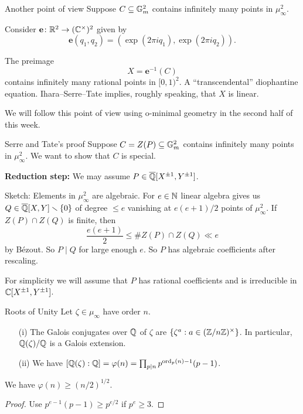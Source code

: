 \documentclass{beamer}
\begin{document}
\begin{frame}{Another point of view}
  Suppose $C\subseteq {\mathbb{G}}_m^2$ contains infinitely many points in
  $\mu_\infty^2$. 
  
  Consider $\mathbf{e}\colon {\mathbb{R}}^2\rightarrow({\mathbb{C}}^\times)^2$ given by
  $$\mathbf{e}(q_1,q_2) = (\exp(2\pi i q_1),\exp(2\pi i q_2)).$$

  The preimage
  \begin{equation*}
    X=\mathbf{e}^{-1}(C)
  \end{equation*}
  contains infinitely many rational points in $[0,1)^2$.
  A ``transcendental''
  diophantine equation. Ihara--Serre--Tate implies, roughly speaking,
  that
  $X$ is linear.

  We will follow this point of view using o-minimal geometry
  in the second half of this week. 
\end{frame}

\begin{frame}{Serre and Tate's proof}
  Suppose $C=Z(P)\subseteq {\mathbb{G}}_m^2$ contains infinitely many points in
  $\mu_\infty^2$. We want to show that $C$ is special. 

  \textbf{Reduction step:} We may assume $P\in {\overline{\mathbb{Q}}}[X^{\pm 1},Y^{\pm
    1}]$.

  Sketch: Elements in $\mu_\infty^2$ are algebraic. %
  For $e\in{\mathbb{N}}$  linear algebra gives us
  $Q\in{\overline{\mathbb{Q}}}[X,Y]\smallsetminus\{0\}$ of degree $\le e$ vanishing at 
  $e(e+1)/2$  points of $\mu_\infty^2$. If $Z(P)\cap Z(Q)$ is finite, then
  $$
  \frac{e(e+1)}{2} \le \# Z(P)\cap Z(Q) \ll e
  $$
  by  B\'ezout. So $P \mid Q$ for large enough $e$. So $P$ has
  algebraic coefficients after rescaling. 
  

  For simplicity we will assume that $P$ has \alert{rational coefficients} and
  is irreducible in ${\mathbb{C}}[X^{\pm 1},Y^{\pm 1}]$. 
\end{frame}

\begin{frame}{Roots of Unity}
  Let $\zeta\in\mu_\infty$ have order $n$.
  \begin{theorem}
    \begin{enumerate}
    \item [(i)] The Galois conjugates over ${\mathbb{Q}}$ of $\zeta$  are $\{\zeta^a : a\in
      ({\mathbb{Z}}/n{\mathbb{Z}})^\times\}$. In particular,
      ${\mathbb{Q}}(\zeta)/{\mathbb{Q}}$ is a Galois extension. 
    \item [(ii)] We have $[{\mathbb{Q}}(\zeta):{\mathbb{Q}}] = \varphi(n)= \prod_{p\mid n}
      p^{\mathrm{ord}_p(n)-1}(p-1)$.
    \end{enumerate}
  \end{theorem}

  \begin{lemma}
    We have $\varphi(n) \ge (n/2)^{1/2}$. 
  \end{lemma}
  \begin{proof}
    Use $p^{e-1}(p-1) \ge p^{e/2}$ if $p^e\ge 3$. 
  \end{proof}
\end{frame}
\end{document}
